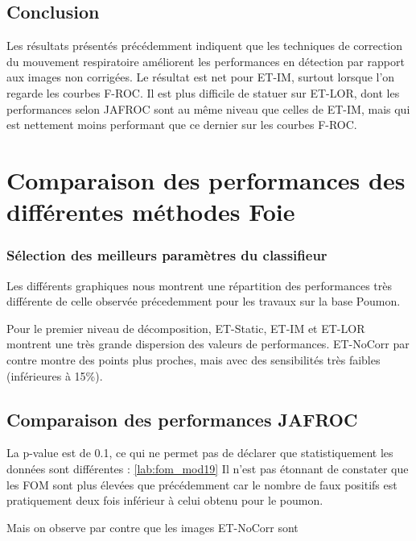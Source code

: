 \subsection{Conclusion}

Les résultats présentés précédemment indiquent que les techniques de correction du mouvement respiratoire améliorent les performances en détection par rapport aux images non corrigées. Le résultat est net pour ET-IM, surtout lorsque l'on regarde les courbes F-ROC. Il est plus difficile de statuer sur ET-LOR, dont les performances selon JAFROC sont au même niveau que celles de ET-IM, mais qui est nettement moins performant que ce dernier sur les courbes F-ROC.


\FloatBarrier

\section{Comparaison des performances des différentes méthodes Foie}


\subsubsection{Sélection des meilleurs paramètres du classifieur}

Les différents graphiques nous montrent une répartition des performances très différente de celle observée précedemment pour les travaux sur la base Poumon. 

Pour le premier niveau de décomposition, ET-Static, ET-IM et ET-LOR montrent une très grande dispersion des valeurs de performances. ET-NoCorr par contre montre des points plus proches, mais avec des sensibilités très faibles (inférieures à 15\%).

\subsection{Comparaison des performances JAFROC}

La p-value est de 0.1, ce qui ne permet pas de déclarer que statistiquement les données sont différentes : \ref{lab:fom_mod19}
Il n'est pas étonnant de constater que les FOM sont plus élevées que précédemment car le nombre de faux positifs est pratiquement deux fois inférieur à celui obtenu pour le poumon.

Mais on observe par contre que les images ET-NoCorr sont

